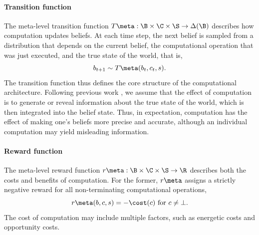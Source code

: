 \paragraph{Transition function}
The meta-level transition function $T\meta: \B \times \C \times \S \rightarrow \Delta(\B)$ describes how computation updates beliefs. At each time step, the next belief is sampled from a distribution that depends on the current belief, the computational operation that was just executed, and the true state of the world, that is,
\begin{equation}
b_{t+1} \sim T\meta(b_t, c_t, s).
\end{equation}
The transition function thus defines the core structure of the computational architecture. Following previous work \citep{matheson1968economic,hay2012selecting}, we assume that the effect of computation is to generate or reveal information about the true state of the world, which is then integrated into the belief state. Thus, in expectation, computation has the effect of making one's beliefs more precise and accurate, although an individual computation may yield misleading information. 



\paragraph{Reward function}
The meta-level reward function $r\meta: \B \times \C \times \S \rightarrow \R$ describes both the costs and benefits of computation. For the former, $r\meta$ assigns a strictly negative reward for all non-terminating computational operations,
%
\begin{equation}
r\meta(b, c, s) = -\cost(c) \text{ for } c \neq \bot.
\end{equation}
%
The cost of computation may include multiple factors, such as energetic costs and opportunity costs. 

